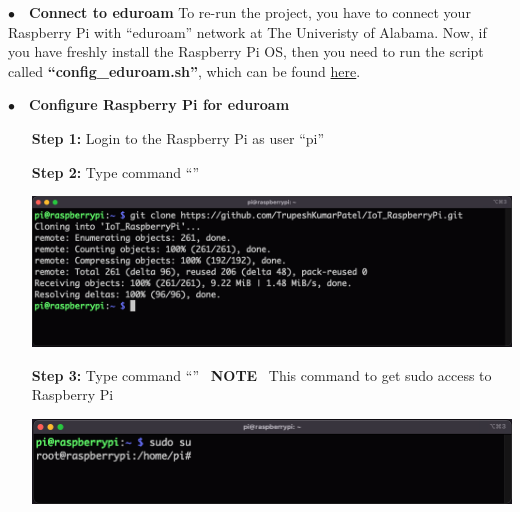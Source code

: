 \noindent$\bullet$~~\textbf{Connect to eduroam}	\label{sec:run-eduroam}
	 To re-run the project, you have to connect your Raspberry Pi with ``eduroam'' network at The Univeristy of Alabama. Now, if you have freshly install the Raspberry Pi OS, then you need to run the script called \textbf{``config\_eduroam.sh''}, which can be found \href{https://github.com/TrupeshKumarPatel/IoT_RaspberryPi/tree/main/source_code/eduroam_config}{here}. 
	 
\noindent$\bullet$~~\textbf{Configure Raspberry Pi for eduroam}
		\begin{itemize}[leftmargin=1.8cm]
			\item[\textbf{Step 1:}] Login to the Raspberry Pi as user ``pi'' %
			\item[\textbf{Step 2:}] Type command ``{\selectfont{git clone https://github\\.com/TrupeshKumarPatel/IoT\_RaspberryPi.\\git}}''\\
				\begin{minipage}{\textwidth}
					\vspace{2mm}
					\includegraphics[scale=0.17]{Images/raspberry_pi/eduroam_config/clone_git.png}
					\vspace{2mm}
				\end{minipage}
			\item[\textbf{Step 3:}] Type command ``{\selectfont{sudo su}}'' ~\danger\textbf{NOTE} ~This command to get sudo access to Raspberry Pi \danger\\
				\begin{minipage}{\textwidth}
					\vspace{2mm}
					\includegraphics[scale=0.2]{Images/raspberry_pi/eduroam_config/sudo_login.png}

\end{minipage}
\end{itemize}
